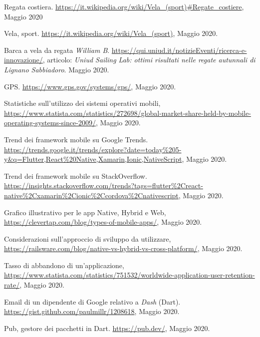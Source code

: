 

\begin{thebibliography}{3}
\frenchspacing

Regata costiera. \url{https://it.wikipedia.org/wiki/Vela_(sport)#Regate_costiere}, Maggio 2020

Vela, sport. \url{https://it.wikipedia.org/wiki/Vela_(sport)}, Maggio 2020.

Barca a vela da regata \textit{William B}. \url{https://qui.uniud.it/notizieEventi/ricerca-e-innovazione/}, articolo: \textit{Uniud Sailing Lab: ottimi risultati nelle regate autunnali di Lignano Sabbiadoro}. Maggio 2020.

GPS. \url{https://www.gps.gov/systems/gps/}, Maggio 2020.

Statistiche sull'utilizzo dei sistemi operativi mobili, \url{https://www.statista.com/statistics/272698/global-market-share-held-by-mobile-operating-systems-since-2009/}, Maggio 2020.

Trend dei framework mobile su Google Trends. \url{https://trends.google.it/trends/explore?date=today\%205-y&q=Flutter,React\%20Native,Xamarin,Ionic,NativeScript}, Maggio 2020.

Trend dei framework mobile su StackOverflow. \url{https://insights.stackoverflow.com/trends?tags=flutter\%2Creact-native\%2Cxamarin\%2Cionic\%2Ccordova\%2Cnativescript}, Maggio 2020.

Grafico illustrativo per le app Native, Hybrid e Web, \url{https://clevertap.com/blog/types-of-mobile-apps/}, Maggio 2020.

Considerazioni sull'approccio di sviluppo da utilizzare, \url{https://railsware.com/blog/native-vs-hybrid-vs-cross-platform/}, Maggio 2020.

Tasso di abbandono di un'applicazione, \url{https://www.statista.com/statistics/751532/worldwide-application-user-retention-rate/}, Maggio 2020.

Email di un dipendente di Google relativo a \textit{Dash} (Dart). \url{https://gist.github.com/paulmillr/1208618}, Maggio 2020.

Pub, gestore dei pacchetti in Dart. \url{https://pub.dev/}, Maggio 2020.


\end{thebibliography}
